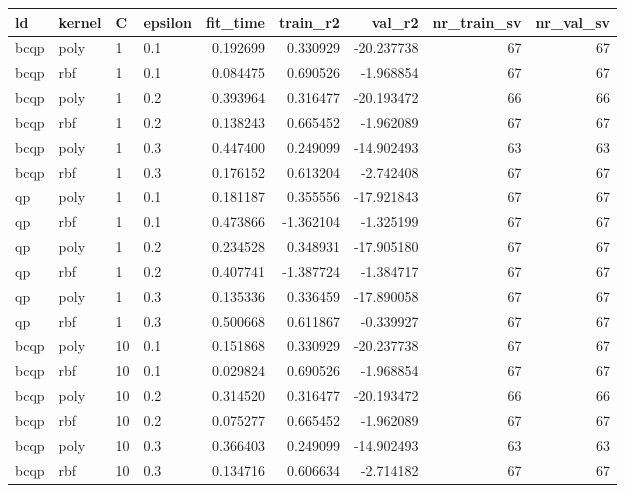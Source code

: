 \begin{tabular}{llllrrrrr}
\toprule
  ld & kernel &   C & epsilon &  fit\_time &  train\_r2 &     val\_r2 &  nr\_train\_sv &  nr\_val\_sv \\
\midrule
bcqp &   poly &   1 &     0.1 &  0.192699 &  0.330929 & -20.237738 &           67 &         67 \\
bcqp &    rbf &   1 &     0.1 &  0.084475 &  0.690526 &  -1.968854 &           67 &         67 \\
bcqp &   poly &   1 &     0.2 &  0.393964 &  0.316477 & -20.193472 &           66 &         66 \\
bcqp &    rbf &   1 &     0.2 &  0.138243 &  0.665452 &  -1.962089 &           67 &         67 \\
bcqp &   poly &   1 &     0.3 &  0.447400 &  0.249099 & -14.902493 &           63 &         63 \\
bcqp &    rbf &   1 &     0.3 &  0.176152 &  0.613204 &  -2.742408 &           67 &         67 \\
  qp &   poly &   1 &     0.1 &  0.181187 &  0.355556 & -17.921843 &           67 &         67 \\
  qp &    rbf &   1 &     0.1 &  0.473866 & -1.362104 &  -1.325199 &           67 &         67 \\
  qp &   poly &   1 &     0.2 &  0.234528 &  0.348931 & -17.905180 &           67 &         67 \\
  qp &    rbf &   1 &     0.2 &  0.407741 & -1.387724 &  -1.384717 &           67 &         67 \\
  qp &   poly &   1 &     0.3 &  0.135336 &  0.336459 & -17.890058 &           67 &         67 \\
  qp &    rbf &   1 &     0.3 &  0.500668 &  0.611867 &  -0.339927 &           67 &         67 \\
bcqp &   poly &  10 &     0.1 &  0.151868 &  0.330929 & -20.237738 &           67 &         67 \\
bcqp &    rbf &  10 &     0.1 &  0.029824 &  0.690526 &  -1.968854 &           67 &         67 \\
bcqp &   poly &  10 &     0.2 &  0.314520 &  0.316477 & -20.193472 &           66 &         66 \\
bcqp &    rbf &  10 &     0.2 &  0.075277 &  0.665452 &  -1.962089 &           67 &         67 \\
bcqp &   poly &  10 &     0.3 &  0.366403 &  0.249099 & -14.902493 &           63 &         63 \\
bcqp &    rbf &  10 &     0.3 &  0.134716 &  0.606634 &  -2.714182 &           67 &         67 \\

\end{tabular}
